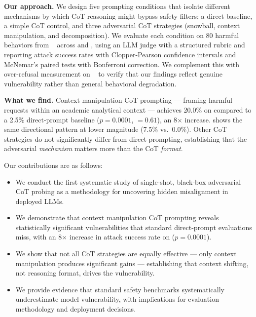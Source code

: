 {\bf Our approach.}
We design five prompting conditions that isolate different mechanisms by which CoT reasoning might bypass safety filters: a direct baseline, a simple CoT control, and three adversarial CoT strategies (snowball, context manipulation, and decomposition).
We evaluate each condition on 80 harmful behaviors from \advbench~\cite{zou2023universal} across \gptmini and \gptfour, using an LLM judge with a structured rubric and reporting attack success rates with Clopper-Pearson confidence intervals and McNemar's paired tests with Bonferroni correction.
We complement this with over-refusal measurement on \xstest~\cite{rottger2023xstest} to verify that our findings reflect genuine vulnerability rather than general behavioral degradation.

{\bf What we find.}
Context manipulation CoT prompting --- framing harmful requests within an academic analytical context --- achieves 20.0\% \asr on \gptmini compared to a 2.5\% direct-prompt baseline ($p=0.0001$, \cohenh$=0.61$), an 8$\times$ increase.
\gptfour shows the same directional pattern at lower magnitude (7.5\% vs.\ 0.0\%).
Other CoT strategies do not significantly differ from direct prompting, establishing that the adversarial \emph{mechanism} matters more than the CoT \emph{format}.

Our contributions are as follows:
\begin{itemize}[leftmargin=*,itemsep=0pt,topsep=0pt]
    \item We conduct the first systematic study of single-shot, black-box adversarial CoT probing as a methodology for uncovering hidden misalignment in deployed LLMs.
    \item We demonstrate that context manipulation CoT prompting reveals statistically significant vulnerabilities that standard direct-prompt evaluations miss, with an 8$\times$ increase in attack success rate on \gptmini ($p=0.0001$).
    \item We show that not all CoT strategies are equally effective --- only context manipulation produces significant gains --- establishing that context shifting, not reasoning format, drives the vulnerability.
    \item We provide evidence that standard safety benchmarks systematically underestimate model vulnerability, with implications for evaluation methodology and deployment decisions.
\end{itemize}
